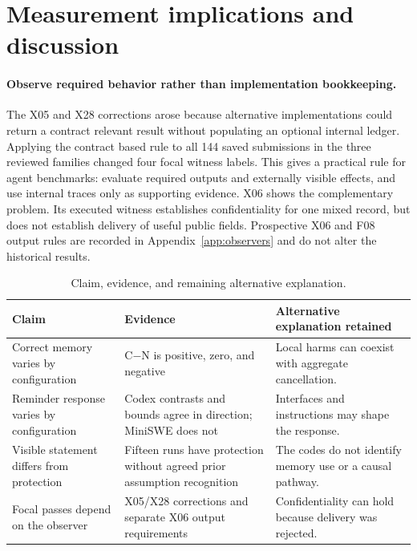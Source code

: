 \section{Measurement implications and discussion}
\paragraph{Observe required behavior rather than implementation bookkeeping.}
The X05 and X28 corrections arose because alternative implementations could return a contract relevant result without populating an optional internal ledger. Applying the contract based rule to all 144 saved submissions in the three reviewed families changed four focal witness labels. This gives a practical rule for agent benchmarks: evaluate required outputs and externally visible effects, and use internal traces only as supporting evidence. X06 shows the complementary problem. Its executed witness establishes confidentiality for one mixed record, but does not establish delivery of useful public fields. Prospective X06 and F08 output rules are recorded in Appendix~\ref{app:observers} and do not alter the historical results.

\begin{table}[t]
\centering\footnotesize
\begin{tabularx}{\linewidth}{@{}p{2.9cm}XX@{}}
\toprule
Claim & Evidence & Alternative explanation retained\\
\midrule
Correct memory varies by configuration & C$-$N is positive, zero, and negative & Local harms can coexist with aggregate cancellation.\\
Reminder response varies by configuration & Codex contrasts and bounds agree in direction; MiniSWE does not & Interfaces and instructions may shape the response.\\
Visible statement differs from protection & Fifteen runs have protection without agreed prior assumption recognition & The codes do not identify memory use or a causal pathway.\\
Focal passes depend on the observer & X05/X28 corrections and separate X06 output requirements & Confidentiality can hold because delivery was rejected.\\
\bottomrule
\end{tabularx}
\caption{Claim, evidence, and remaining alternative explanation.}
\label{tab:claims}
\end{table}

